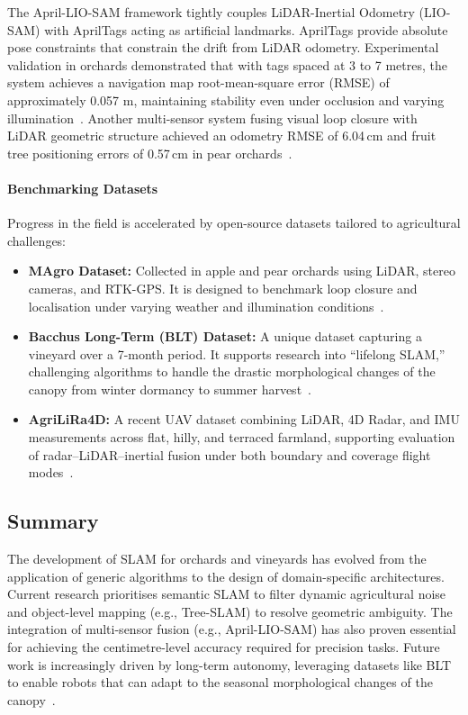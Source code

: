 The April-LIO-SAM framework tightly couples LiDAR-Inertial Odometry (LIO-SAM) with AprilTags acting as artificial landmarks. AprilTags provide absolute pose constraints that constrain the drift from LiDAR odometry. Experimental validation in orchards demonstrated that with tags spaced at 3 to 7 metres, the system achieves a navigation map root-mean-square error (RMSE) of approximately 0.057 m, maintaining stability even under occlusion and varying illumination~\cite{guanResearchAgriculturalAutonomous2025}. Another multi-sensor system fusing visual loop closure with LiDAR geometric structure achieved an odometry RMSE of 6.04\,cm and fruit tree positioning errors of 0.57\,cm in pear orchards~\cite{tangFruitTreeMappingSystem2024}.

\paragraph{Benchmarking Datasets}
Progress in the field is accelerated by open-source datasets tailored to agricultural challenges:
\begin{itemize}
    \item \textbf{MAgro Dataset:} Collected in apple and pear orchards using LiDAR, stereo cameras, and RTK-GPS. It is designed to benchmark loop closure and localisation under varying weather and illumination conditions~\cite{schmidtROVERMultiSeasonDataset2024, marzoatancoMAgroDatasetDataset2024}.
    \item \textbf{Bacchus Long-Term (BLT) Dataset:} A unique dataset capturing a vineyard over a 7-month period. It supports research into ``lifelong SLAM,'' challenging algorithms to handle the drastic morphological changes of the canopy from winter dormancy to summer harvest~\cite{polvaraBacchusLongTermBLT2024}.
    \item \textbf{AgriLiRa4D:} A recent UAV dataset combining LiDAR, 4D Radar, and IMU measurements across flat, hilly, and terraced farmland, supporting evaluation of radar--LiDAR--inertial fusion under both boundary and coverage flight modes~\cite{zhanAgriLiRa4DMultiSensorUAV2026}.
\end{itemize}

\subsection{Summary}
\label{subsec:vineyard-robotics-summary}
The development of SLAM for orchards and vineyards has evolved from the application of generic algorithms to the design of domain-specific architectures. Current research prioritises semantic SLAM to filter dynamic agricultural noise and object-level mapping (e.g., Tree-SLAM) to resolve geometric ambiguity. The integration of multi-sensor fusion (e.g., April-LIO-SAM) has also proven essential for achieving the centimetre-level accuracy required for precision tasks. Future work is increasingly driven by long-term autonomy, leveraging datasets like BLT to enable robots that can adapt to the seasonal morphological changes of the canopy~\cite{polvaraBacchusLongTermBLT2024}.

